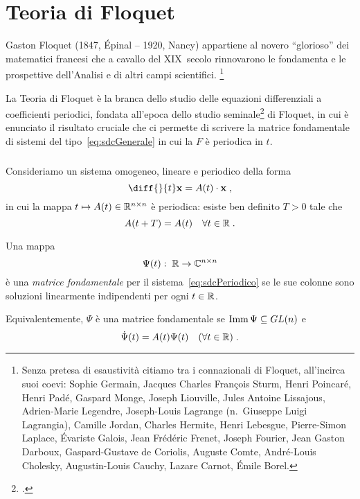 \chapter{Teoria di Floquet}
\label{chap:floquetTheory}
Gaston Floquet (1847, Épinal -- 1920, Nancy)
appartiene al novero ``glorioso'' dei matematici francesi che a cavallo del XIX~secolo rinnovarono
le fondamenta e le prospettive dell'Analisi e di altri campi scientifici.
\footnote{Senza pretesa di esaustività citiamo tra i connazionali di Floquet, all'incirca suoi coevi: Sophie Germain,
Jacques Charles François Sturm, Henri Poincaré, Henri Padé, Gaspard Monge, Joseph Liouville,
Jules Antoine Lissajous, Adrien-Marie Legendre, Joseph-Louis Lagrange (n.~Giuseppe Luigi Lagrangia),
Camille Jordan, Charles Hermite, Henri Lebesgue, Pierre-Simon Laplace,
Évariste Galois, Jean Frédéric Frenet, Joseph Fourier, Jean Gaston Darboux, Gaspard-Gustave de Coriolis,
Auguste Comte, André-Louis Cholesky, Augustin-Louis Cauchy, Lazare Carnot, Émile Borel.}

La Teoria di Floquet è la branca dello studio delle equazioni differenziali a coefficienti periodici,
fondata all'epoca dello studio seminale\footcite{gFloquet} di Floquet, in cui è enunciato il
risultato cruciale che ci permette di scrivere la matrice fondamentale di sistemi del tipo~\eqref{eq:sdcGenerale}
in cui la $F$ è periodica in $t$.

\paragraph{}
Consideriamo un sistema omogeneo, lineare e periodico della forma
\begin{equation}
    \diff{}{t} \mathbf{x} = A(t) \cdot \mathbf{x} \; ,
    \label{eq:sdcPeriodico}
\end{equation}
in cui la mappa $t \mapsto A(t) \in \mathbb{R}^{n \times n}$ è periodica: esiste ben definito $T >0$ tale che
$$A(t+T) =A(t) \quad \forall t \in \mathbb{R} \; .$$

\begin{definizione}
    Una mappa
    $$\Psi (t) : \; \mathbb{R} \rightarrow \mathbb{C}^{n \times n}$$
    è una \emph{matrice fondamentale} per il sistema~\eqref{eq:sdcPeriodico} se le sue colonne sono soluzioni
    linearmente indipendenti per ogni $t \in \mathbb{R}$.
\end{definizione}
Equivalentemente, $\Psi$ è una matrice fondamentale se $\operatorname{Imm} \Psi \subseteq GL(n)$ e
$$ \dot{\Psi} (t) = A(t) \Psi (t) \quad (\forall t \in \mathbb{R}) \; .$$

